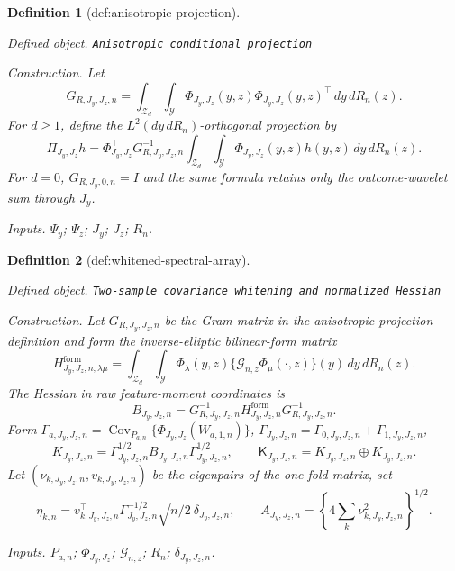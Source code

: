 \documentclass{article}
\newtheorem{definition}{Definition}
\begin{document}
\begin{definition}[def:anisotropic-projection]\label{def:anisotropic-projection}
\par\smallskip\noindent\emph{Defined object.} \texttt{Anisotropic conditional projection}
\par\smallskip\noindent\emph{Construction.} Let
\[
G_{R,J_y,J_z,n}=\int_{\mathcal Z_d}\int_{\mathcal Y}
\Phi_{J_y,J_z}(y,z)\Phi_{J_y,J_z}(y,z)^{\top}\,dy\,dR_n(z).
\]
For \(d\ge1\), define the \(L^2(dy\,dR_n)\)-orthogonal projection by
\[
\Pi_{J_y,J_z}h
=\Phi_{J_y,J_z}^{\top}G_{R,J_y,J_z,n}^{-1}
\int_{\mathcal Z_d}\int_{\mathcal Y}\Phi_{J_y,J_z}(y,z)h(y,z)\,dy\,dR_n(z).
\]
For \(d=0\), \(G_{R,J_y,0,n}=I\) and the same formula retains only the outcome-wavelet sum through \(J_y\).
\par\smallskip\noindent\emph{Inputs.} \(\Psi_y\); \(\Psi_z\); \(J_y\); \(J_z\); \(R_n\).
\end{definition}

\begin{definition}[def:whitened-spectral-array]\label{def:whitened-spectral-array}
\par\smallskip\noindent\emph{Defined object.} \texttt{Two-\allowbreak{}sample covariance whitening and normalized Hessian}
\par\smallskip\noindent\emph{Construction.} Let \(G_{R,J_y,J_z,n}\) be the Gram matrix in the anisotropic-projection definition and form the inverse-elliptic bilinear-form matrix
\[
H^{\mathrm{form}}_{J_y,J_z,n;\lambda\mu}
=\int_{\mathcal Z_d}\int_{\mathcal Y}\Phi_\lambda(y,z)
\{\mathcal G_{n,z}\Phi_\mu(\cdot,z)\}(y)\,dy\,dR_n(z).
\]
The Hessian in raw feature-moment coordinates is
\[
B_{J_y,J_z,n}=G_{R,J_y,J_z,n}^{-1}H^{\mathrm{form}}_{J_y,J_z,n}G_{R,J_y,J_z,n}^{-1}.
\]
Form \(\Gamma_{a,J_y,J_z,n}=\operatorname{Cov}_{P_{a,n}}\{\Phi_{J_y,J_z}(W_{a,1,n})\}\), \(\Gamma_{J_y,J_z,n}=\Gamma_{0,J_y,J_z,n}+\Gamma_{1,J_y,J_z,n}\),
\[
K_{J_y,J_z,n}=\Gamma_{J_y,J_z,n}^{1/2}B_{J_y,J_z,n}\Gamma_{J_y,J_z,n}^{1/2},
\qquad
\mathsf K_{J_y,J_z,n}=K_{J_y,J_z,n}\oplus K_{J_y,J_z,n}.
\]
Let \((\nu_{k,J_y,J_z,n},v_{k,J_y,J_z,n})\) be the eigenpairs of the one-fold matrix, set
\[
\eta_{k,n}=v_{k,J_y,J_z,n}^{\top}\Gamma_{J_y,J_z,n}^{-1/2}\sqrt{n/2}\,\delta_{J_y,J_z,n},
\qquad
A_{J_y,J_z,n}=\left\{4\sum_k\nu_{k,J_y,J_z,n}^2\right\}^{1/2}.
\]
\par\smallskip\noindent\emph{Inputs.} \(P_{a,n}\); \(\Phi_{J_y,J_z}\); \(\mathcal G_{n,z}\); \(R_n\); \(\delta_{J_y,J_z,n}\).
\end{definition}
\end{document}
